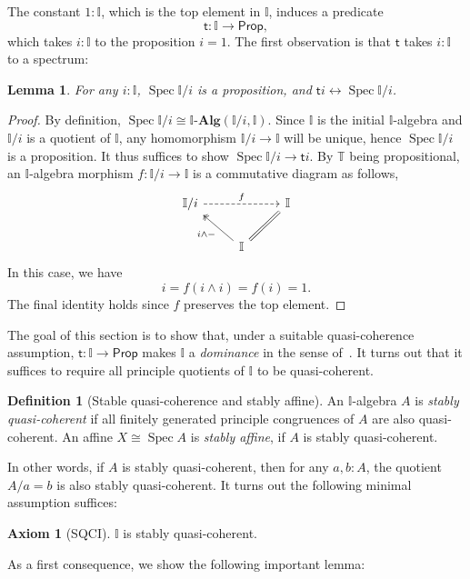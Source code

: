 \documentclass[12pt]{amsart}
\newtheorem{lemma}[theorem]{Lemma}
\theoremstyle{definition}
\newtheorem{definition}[theorem]{Definition}
\newtheorem*{axiom}{Axiom}
\newcommand{\mb}[1]{\mathbf{#1}}
\newcommand{\mbb}[1]{\mathbb{#1}}
\newcommand{\T}{\mbb T}
\newcommand{\I}{\mbb I}
\newcommand{\ms}[1]{\mathsf{#1}}
\newcommand{\alg}{\text{-}\mb{Alg}}
\newcommand{\eq}{\leftrightarrow}
\newcommand{\pp}{\ms{Prop}}
\newcommand{\spec}{\operatorname{Spec}}
\begin{document}
The constant $1 : \I$, which is the top element in $\I$, induces a predicate
\[ \ms t : \I \to \pp, \]
which takes $i : \I$ to the proposition $i = 1$. The first observation is that $\ms t$ takes $i : \I$ to a spectrum:

\begin{lemma}\label{lem:openpropaffine}
  For any $i : \I$, $\spec\I/i$ is a proposition, and $\ms ti \eq \spec \I/i$.
\end{lemma}
\begin{proof}
  By definition, $\spec \I/i \cong \I\alg(\I/i,\I)$. Since $\I$ is the initial $\I$-algebra and $\I/i$ is a quotient of $\I$, any homomorphism $\I/i \to \I$ will be unique, hence $\spec\I/i$ is a proposition. It thus suffices to show $\spec\I/i \to \ms ti$. By $\T$ being propositional, an $\I$-algebra morphism $f : \I/i \to \I$ is a commutative diagram as follows,
  \[
  \begin{tikzcd}
    \I/i \ar[rr, dashed, "f"] & & \I \\ 
    & \I \ar[ul, two heads, "i \wedge -"] \ar[ur, equal]
  \end{tikzcd}
  \]
  In this case, we have
  \[ i = f(i \wedge i) = f(i) = 1. \]
  The final identity holds since $f$ preserves the top element. 
\end{proof}

The goal of this section is to show that, under a suitable quasi-coherence assumption, $\ms t : \I \to \pp$ makes $\I$ a \emph{dominance} in the sense of~\cite{rosolini1986continuity}. It turns out that it suffices to require all principle quotients of $\I$ to be quasi-coherent.

\begin{definition}[Stable quasi-coherence and stably affine]
  An $\I$-algebra $A$ is \emph{stably quasi-coherent} if all finitely generated principle congruences of $A$ are also quasi-coherent. An affine $X \cong \spec A$ is \emph{stably affine}, if $A$ is stably quasi-coherent.
\end{definition}

In other words, if $A$ is stably quasi-coherent, then for any $a,b:A$, the quotient $A/a=b$ is also stably quasi-coherent. It turns out the following minimal assumption suffices:

\begin{axiom}[SQCI]\label{ax:sqci}
  $\I$ is stably quasi-coherent.
\end{axiom}

As a first consequence, we show the following important lemma:
\end{document}
